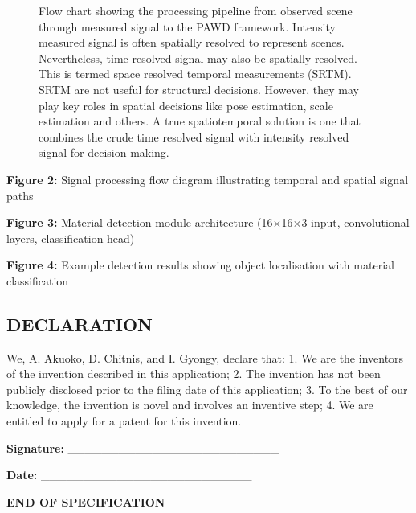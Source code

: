 \documentclass[11pt,a4paper]{article}
\begin{document}
\begin{enumerate}[leftmargin=*,label=\alph*)]
\begin{figure}[H]
{
}
\caption[Flow chart showing the processing pipeline from observed scene through measured signal to the PAWD framework.]{Flow chart showing the processing pipeline from observed scene through measured signal to the PAWD framework. Intensity measured signal is often spatially resolved to represent scenes. Nevertheless, time resolved signal may also be spatially resolved. This is termed space resolved temporal measurements (SRTM). SRTM are not useful for structural decisions. However, they may play key roles in spatial decisions like pose estimation, scale estimation and others. A true spatiotemporal solution is one that combines the crude time resolved signal with intensity resolved signal for decision making.}
\label{fig:1_1}
\end{figure}

\textbf{Figure 2:} Signal processing flow diagram illustrating temporal and spatial signal paths

\textbf{Figure 3:} Material detection module architecture (16$\times$16$\times$3 input, convolutional layers, classification head)

\textbf{Figure 4:} Example detection results showing object localisation with material classification

\vspace{0.5em}
\subsection{DECLARATION}

We, A. Akuoko, D. Chitnis, and I. Gyongy, declare that:
1. We are the inventors of the invention described in this application;
2. The invention has not been publicly disclosed prior to the filing date of this application;
3. To the best of our knowledge, the invention is novel and involves an inventive step;
4. We are entitled to apply for a patent for this invention.

\textbf{Signature:} _________________________

\textbf{Date:} _________________________

\vspace{0.5em}
\textbf{END OF SPECIFICATION}

\end{enumerate}
\end{document}
